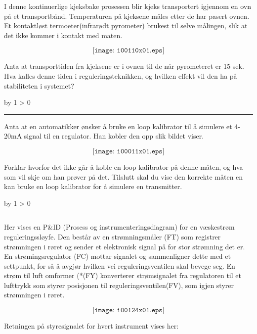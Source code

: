 \documentclass[12pt,a4paper]{article}
\def\oppgave{
            \advance\questnum by 1
            \ifnum \questnum > 0
                 \hrule
                 \vskip 3pt
                 \leftline{Oppgave \the\questnum}
                 \vskip 3pt \fi}
\begin{document}
I denne kontinuerlige kjeksbake prosessen blir kjeks transportert igjennom en ovn på et transportbånd. Temperaturen på kjeksene måles etter de har pasert ovnen. Et kontaktløst termoeter(infrarødt pyrometer) brukest til selve målingen, slik at det  ikke kommer i kontakt med maten.  

$$\texttt{[image: i00110x01.eps]}$$

Anta at transporttiden fra kjeksene er i ovnen til de når pyrometeret er 15 sek. Hva kalles denne tiden i reguleringsteknikken, og hvilken effekt vil den ha på stabiliteten i systemet?

\vskip 10pt \filbreak 
\oppgave{} 

Anta at en automatikker ønsker å bruke en loop kalibrator til å simulere et 4-20mA signal til en regulator. Han kobler den opp slik bildet viser. 

$$\texttt{[image: i00011x01.eps]}$$

Forklar hvorfor det ikke går å koble en loop kalibrator på denne måten, og hva som vil skje om han prøver på det. Tilslutt skal du vise den korrekte måten en kan bruke en loop kalibrator for å simulere en transmitter. 

\vfil

\eject
\vskip 10pt \filbreak 
\oppgave{} 

Her vises en P\&ID (Prosess og instrumenteringsdiagram) for en væskestrøm reguleringssløyfe. Den består av en strømningsmåler (FT) som registrer strømningen i røret og sender et elektronisk signal på for stor strømning det er. En strømingsregulator (FC) mottar signalet og sammenligner dette med et settpunkt, for så å avgjør hvilken vei reguleringsventilen skal bevege seg. En strøm til luft omformer (*(FY) konverterer strømsignalet fra regulatoren til et lufttrykk som styrer posisjonen til reguleringsventilen(FV), som igjen styrer strømningen i røret. 

$$\texttt{[image: i00124x01.eps]}$$

Retningen på styresignalet for hvert instrument vises her:
\end{document}
